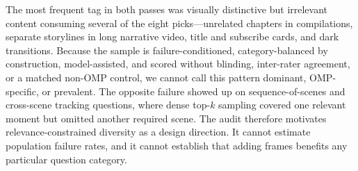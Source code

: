 \documentclass[11pt]{article}
\begin{document}
The most frequent tag in both passes was visually distinctive but irrelevant content consuming several of the eight picks---unrelated chapters in compilations, separate storylines in long narrative video, title and subscribe cards, and dark transitions. Because the sample is failure-conditioned, category-balanced by construction, model-assisted, and scored without blinding, inter-rater agreement, or a matched non-OMP control, we cannot call this pattern dominant, OMP-specific, or prevalent.
The opposite failure showed up on sequence-of-scenes and cross-scene tracking questions, where dense top-$k$ sampling covered one relevant moment but omitted another required scene.
The audit therefore motivates relevance-constrained diversity as a design direction.
It cannot estimate population failure rates, and it cannot establish that adding frames benefits any particular question category.
\end{document}
